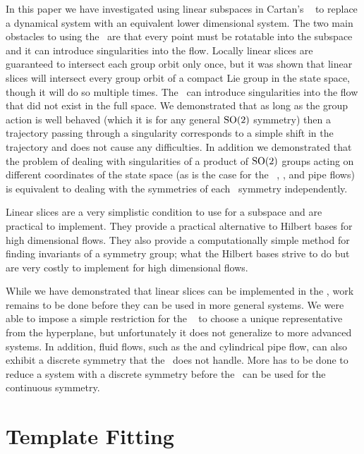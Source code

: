 {In this paper we have investigated using linear subspaces in Cartan's \mslices\  to replace a dynamical system with an equivalent lower dimensional system. The two main obstacles to using the \mslices\ are that every point must be rotatable into the subspace and it can introduce singularities into the flow. Locally linear slices are guaranteed to intersect each group orbit only once, but it was shown that linear slices will intersect every group orbit of a compact Lie group in the state space, though it will do so multiple times. The \mslices\ can introduce singularities into the flow that did not exist in the full space. We demonstrated that as long as the group action is well behaved (which it is for any general $\textrm{SO}(2)$ symmetry) then a trajectory passing through a singularity corresponds to a simple shift in the trajectory and does not cause any difficulties. In addition we demonstrated that the problem of dealing with singularities of a product of $\textrm{SO}(2)$ groups acting on different coordinates of the state space (as is the case for the \KS\ , {\pCf}  , and pipe  flows) is equivalent to dealing with the symmetries of each \ symmetry independently.

Linear slices are a very simplistic condition to use for a subspace and are practical to implement. They provide a practical alternative to Hilbert bases for high dimensional flows. They also provide a computationally simple method for finding invariants of a symmetry group; what the Hilbert bases strive to do but are very costly to implement for high dimensional flows.

While we have demonstrated that linear slices can be implemented in the \mslices, work remains to be done before they can be used in more general systems. We were able to impose a simple restriction for the \cLe\  to choose a unique representative from the hyperplane, but unfortunately it does not generalize to more advanced systems. In addition, fluid flows, such as the {\pCf} and cylindrical pipe flow, can also exhibit a discrete symmetry that the \mslices\ does not handle. More has to be done to reduce a system with a discrete symmetry before the \mslices\ can be used for the continuous symmetry.

\section{Template Fitting}

}
